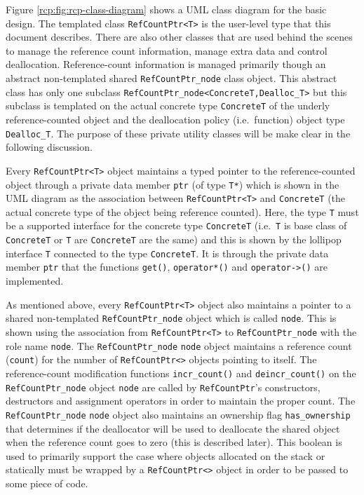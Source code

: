 Figure {}\ref{rcp:fig:rcp-class-diagram} shows a UML
{}\cite{ref:uml_distilled_2nd_ed} class diagram for the basic design.
The templated class {}\texttt{Ref\-Count\-Ptr<T>} is the user-level
type that this document describes.  There are also other classes that
are used behind the scenes to manage the reference count information,
manage extra data and control deallocation.  Reference-count
information is managed primarily though an abstract non-templated
shared {}\texttt{Ref\-Count\-Ptr\-\_node} class object.  This abstract
class has only one subclass
{}\texttt{Ref\-Count\-Ptr\-\_node<\-ConcreteT\-,Dealloc\_T>} but this
subclass is templated on the actual concrete type {}\texttt{ConcreteT}
of the underly reference-counted object and the deallocation policy
(i.e.~function) object type {}\texttt{Dealloc\_T}.  The purpose of
these private utility classes will be make clear in the following
discussion.

Every {}\texttt{Ref\-Count\-Ptr<T>} object maintains a typed pointer
to the reference-counted object through a private data member
{}\texttt{ptr} (of type {}\texttt{T*}) which is shown in the UML
diagram as the association between {}\texttt{Ref\-Count\-Ptr<T>} and
{}\texttt{ConcreteT} (the actual concrete type of the object being
reference counted).  Here, the type {}\texttt{T} must be a supported
interface for the concrete type {}\texttt{ConcreteT}
(i.e.~{}\texttt{T} is base class of {}\texttt{ConcreteT} or
{}\texttt{T} are {}\texttt{ConcreteT} are the same) and this is shown
by the lollipop interface {}\texttt{T} connected to the type
{}\texttt{ConcreteT}.  It is through the private data member
{}\texttt{ptr} that the functions {}\texttt{get()},
{}\texttt{operator*()} and {}\texttt{operator->()} are implemented.

As mentioned above, every {}\texttt{Ref\-Count\-Ptr<T>} object also
maintains a pointer to a shared non-templated
{}\texttt{Ref\-Count\-Ptr\-\_node} object which is called
{}\texttt{node}.  This is shown using the association from
{}\texttt{Ref\-Count\-Ptr<T>} to {}\texttt{Ref\-Count\-Ptr\-\_node}
with the role name {}\texttt{node}.  The
{}\texttt{Ref\-Count\-Ptr\-\_node} {}\texttt{node} object maintains a
reference count ({}\texttt{count}) for the number of
{}\texttt{Ref\-Count\-Ptr<>} objects pointing to itself.  The
reference-count modification functions {}\texttt{incr\_count()} and
{}\texttt{deincr\_count()} on the {}\texttt{Ref\-Count\-Ptr\-\_node}
object {}\texttt{node} are called by {}\texttt{Ref\-Count\-Ptr}'s
constructors, destructors and assignment operators in order to
maintain the proper count.  The {}\texttt{Ref\-Count\-Ptr\-\_node}
{}\texttt{node} object also maintains an ownership flag
{}\texttt{has\-\_ownership} that determines if the deallocator will be
used to deallocate the shared object when the reference count goes to
zero (this is described later).  This boolean is used to primarily
support the case where objects allocated on the stack or statically
must be wrapped by a {}\texttt{Ref\-Count\-Ptr<>} object in order to
be passed to some piece of code.

